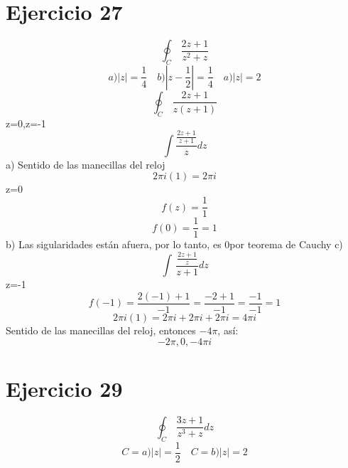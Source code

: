 \documentclass{article}
\begin{document}
\section{Ejercicio 27}
\[
\oint_{C}  \, \frac{2z+1}{z^2+z} 
\]
\begin{equation}
a) |z|=\frac{1}{4} \quad b) |z-\frac{1}{2}|=\frac{1}{4} \quad a) |z|=2 
\end{equation}
\begin{equation}
\oint_{C}  \, \frac{2z+1}{z(z+1)} 
\end{equation}
z=0,z=-1
\begin{equation}
\int \frac{\frac{2z+1}{z+1}}{z} dz 
\end{equation}
a) Sentido de las manecillas del reloj
\begin{equation}
2\pi i(1)=2\pi i
\end{equation}
z=0
\begin{equation}
f(z)=\frac{1}{1}
\end{equation}
\begin{equation}
f(0)=\frac{1}{1}=1
\end{equation}
b)
Las sigularidades están afuera, por lo tanto, es 0por teorema de Cauchy
c)
\begin{equation}
\int  \, \frac{\frac{2z+1}{z}}{z+1} dz 
\end{equation}
z=-1
\begin{equation}
f(-1)=\frac{2(-1)+1}{-1}=\frac{-2+1}{-1}=\frac{-1}{-1}=1
\end{equation}
\begin{equation}
2\pi i(1)=2 \pi i +2\pi i + 2\pi i = 4\pi i 
\end{equation}
Sentido de las manecillas del reloj, entonces \(-4\pi\), así: 
\begin{equation}
-2\pi,0,-4\pi i 
\end{equation}

\section{Ejercicio 29}
\[
\oint_{C}  \, \frac{3z+1}{z^3+z} dz
\]
\begin{equation}
C=a)|z|=\frac{1}{2} \quad C=b)|z|=2
\end{equation}
\end{document}
